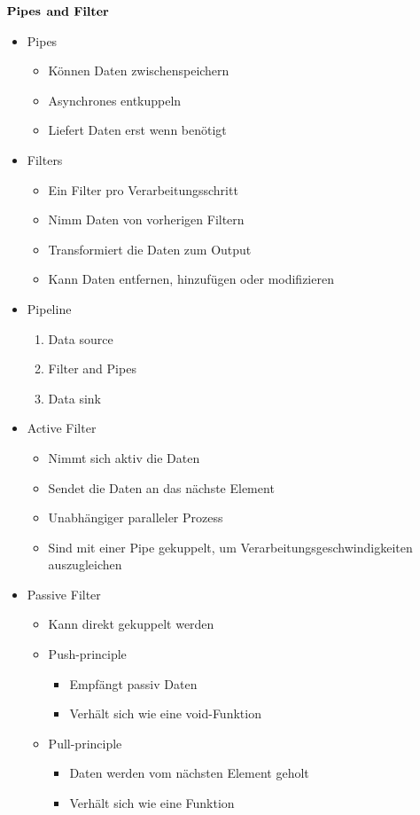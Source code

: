 $\bold{Pipes}$ $\bold{and}$ $\bold{Filter}$
\begin{itemize}
	\item Pipes
		\begin{itemize}
			\item Können Daten zwischenspeichern
			\item Asynchrones entkuppeln
			\item Liefert Daten erst wenn benötigt 
		\end{itemize}
	\item Filters
		\begin{itemize}
			\item Ein Filter pro Verarbeitungsschritt
			\item Nimm Daten von vorherigen Filtern
			\item Transformiert die Daten zum Output
			\item Kann Daten entfernen, hinzufügen oder modifizieren 
		\end{itemize}
	\item Pipeline
		\begin{enumerate}
			\item Data source
			\item Filter and Pipes
			\item Data sink
		\end{enumerate}
	\item Active Filter
		\begin{itemize}
			\item Nimmt sich aktiv die Daten
			\item Sendet die Daten an das nächste Element
			\item Unabhängiger paralleler Prozess
			\item Sind mit einer Pipe gekuppelt, um Verarbeitungsgeschwindigkeiten auszugleichen
		\end{itemize} 
	\item Passive Filter
		\begin{itemize}
			\item Kann direkt gekuppelt werden
			\item Push-principle
				\begin{itemize}
					\item Empfängt passiv Daten
					\item Verhält sich wie eine void-Funktion
				\end{itemize}
			\item Pull-principle
				\begin{itemize}
					\item Daten werden vom nächsten Element geholt
					\item Verhält sich wie eine Funktion
				\end{itemize}
		\end{itemize}
\end{itemize}
